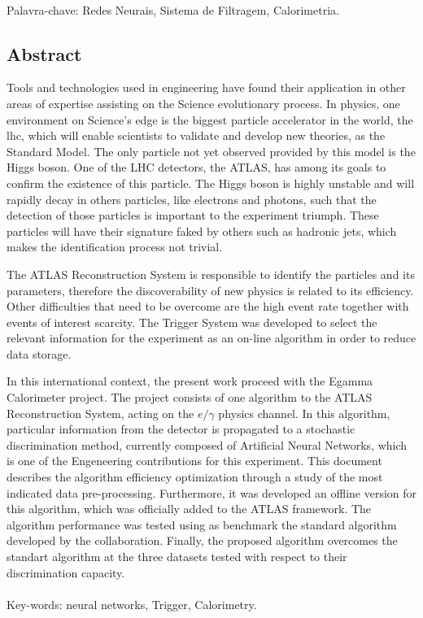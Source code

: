 \paragraph*{}

\noindent Palavra-chave: Redes Neurais, Sistema de Filtragem, Calorimetria.

\vfill

\clearpage

\vfill
\begin{center}
\section*{Abstract\label{Abstract}}
\end{center}

Tools and technologies used in engineering have found their
application in other areas of expertise assisting on the Science evolutionary
process. In physics, one environment on Science's edge is the biggest
particle accelerator in the world, the \acrshort{lhc}, which will enable
scientists to validate and develop new theories, as the Standard Model. The only
particle not yet observed provided by this model is the Higgs boson. One of the LHC 
detectors, the ATLAS, has among its goals to confirm the existence
of this particle. The Higgs boson is highly unstable and will rapidly
decay in others particles, like electrons and photons, such that the detection
of those particles is important to the experiment triumph. These particles will 
have their signature faked by others such as hadronic jets, 
which makes the identification process not trivial.

The ATLAS Reconstruction System is responsible to identify the particles and its
parameters, therefore the discoverability of new physics is related to its
efficiency. Other difficulties that need to be overcome are the high event rate together
with events of interest scarcity. The Trigger System was developed to
select the relevant information for the experiment as an on-line algorithm in
order to reduce data storage.

In this international context, the present work proceed with the Egamma
Calorimeter project. The project consists of one algorithm to the 
ATLAS Reconstruction System, acting on the $e/\gamma$ physics channel. In this algorithm,
particular information from the detector is propagated to a stochastic
discrimination method, currently composed of Artificial Neural Networks, which
is one of the Engeneering contributions for this experiment.
This document describes the algorithm efficiency optimization through a study
of the most indicated data pre-processing. Furthermore, it was developed an
offline version for this algorithm, which was officially added to the ATLAS framework. 
The algorithm performance was tested using as benchmark the
standard algorithm developed by the collaboration. Finally, the proposed
algorithm overcomes the standart algorithm at the three datasets tested with
respect to their discrimination capacity.

\paragraph*{}

\noindent Key-words: neural networks, Trigger, Calorimetry.

\vfill
\clearpage
